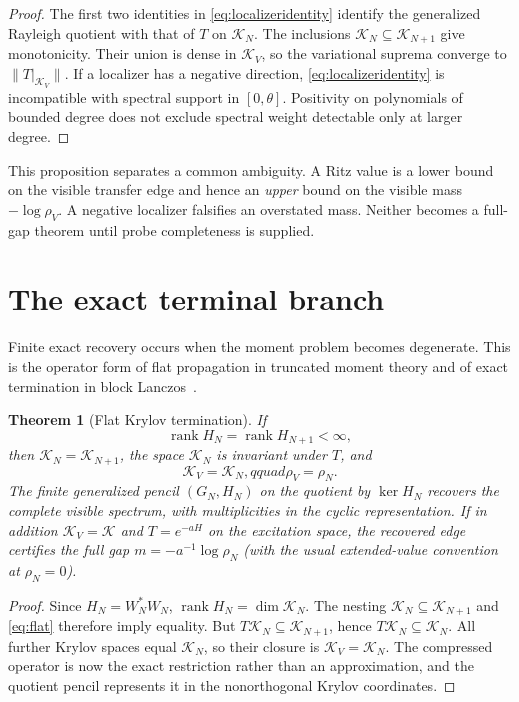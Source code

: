 \documentclass[11pt]{article}
\newtheorem{theorem}{Theorem}[section]
\theoremstyle{definition}
\theoremstyle{remark}
\newcommand{\K}{\mathcal K}
\newcommand{\rank}{\operatorname{rank}}
\begin{document}
\begin{proof}
The first two identities in \cref{eq:localizeridentity} identify the
generalized Rayleigh quotient with that of $T$ on $\K_N$.  The inclusions
$\K_N\subseteq\K_{N+1}$ give monotonicity.  Their union is dense in $\K_V$,
so the variational suprema converge to $\|T|_{\K_V}\|$.  If a localizer has a
negative direction, \cref{eq:localizeridentity} is incompatible with spectral
support in $[0,\theta]$.  Positivity on polynomials of bounded degree does not
exclude spectral weight detectable only at larger degree.
\end{proof}

This proposition separates a common ambiguity.  A Ritz value is a lower bound
on the visible transfer edge and hence an \emph{upper} bound on the visible
mass $-\log\rho_V$.  A negative localizer falsifies an overstated mass.  Neither
becomes a full-gap theorem until probe completeness is supplied.

\section{The exact terminal branch}

Finite exact recovery occurs when the moment problem becomes degenerate.
This is the operator form of flat propagation in truncated moment theory and
of exact termination in block Lanczos~\cite{CurtoMatrix2022,CurtoExtremal2006,Madler2023,FilteredRR}.

\begin{theorem}[Flat Krylov termination]                \label{thm:flat}
If
\begin{equation}
  \rank H_N=\rank H_{N+1}<\infty,                      \label{eq:flat}
\end{equation}
then $\K_N=\K_{N+1}$, the space $\K_N$ is invariant under $T$, and
\begin{equation}
  \K_V=\K_N,qquad \rho_V=\rho_N.                      \label{eq:terminaledge}
\end{equation}
The finite generalized pencil $(G_N,H_N)$ on the quotient by $\ker H_N$
recovers the complete visible spectrum, with multiplicities in the cyclic
representation.  If in addition $\K_V=\K$ and $T=e^{-aH}$ on the excitation
space, the recovered edge certifies the full gap
$m=-a^{-1}\log\rho_N$ (with the usual extended-value convention at
$\rho_N=0$).
\end{theorem}

\begin{proof}
Since $H_N=W_N^*W_N$, $\rank H_N=\dim\K_N$.  The nesting
$\K_N\subseteq\K_{N+1}$ and \cref{eq:flat} therefore imply equality.  But
$T\K_N\subseteq\K_{N+1}$, hence $T\K_N\subseteq\K_N$.  All further Krylov
spaces equal $\K_N$, so their closure is $\K_V=\K_N$.  The compressed operator
is now the exact restriction rather than an approximation, and the quotient
pencil represents it in the nonorthogonal Krylov coordinates.
\end{proof}
\end{document}

